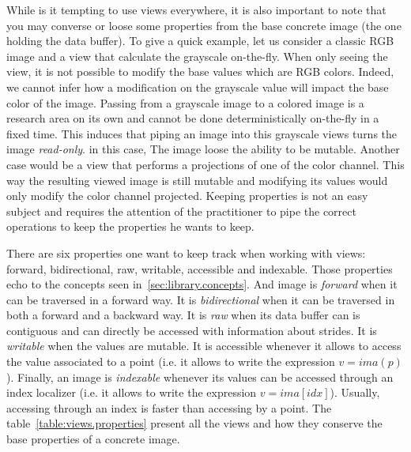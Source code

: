 While is it tempting to use views everywhere, it is also important to note that you may converse or loose some
properties from the base concrete image (the one holding the data buffer). To give a quick example, let us consider a
classic RGB image and a view that calculate the grayscale on-the-fly. When only seeing the view, it is not possible to
modify the base values which are RGB colors. Indeed, we cannot infer how a modification on the grayscale value will
impact the base color of the image. Passing from a grayscale image to a colored image is a research area on its own and
cannot be done deterministically on-the-fly in a fixed time. This induces that piping an image into this grayscale views
turns the image \emph{read-only}. in this case, The image loose the ability to be mutable. Another case would be a view
that performs a projections of one of the color channel. This way the resulting viewed image is still mutable and
modifying its values would only modify the color channel projected. Keeping properties is not an easy subject and
requires the attention of the practitioner to pipe the correct operations to keep the properties he wants to keep.

There are six properties one want to keep track when working with views: forward, bidirectional, raw, writable,
accessible and indexable. Those properties echo to the concepts seen in~\cref{sec:library.concepts}. And image is
\emph{forward} when it can be traversed in a forward way. It is \emph{bidirectional} when it can be traversed in both a
forward and a backward way. It is \emph{raw} when its data buffer can is contiguous and can directly be accessed with
information about strides. It is \emph{writable} when the values are mutable. It is accessible whenever it allows to
access the value associated to a point (i.e. it allows to write the expression $v = ima(p)$). Finally, an image is
\emph{indexable} whenever its values can be accessed through an index localizer (i.e. it allows to write the
expression $v = ima[idx]$). Usually, accessing through an index is faster than accessing by a point. The
table~\cref{table:views.properties} present all the views and how they conserve the base properties of a concrete image.

